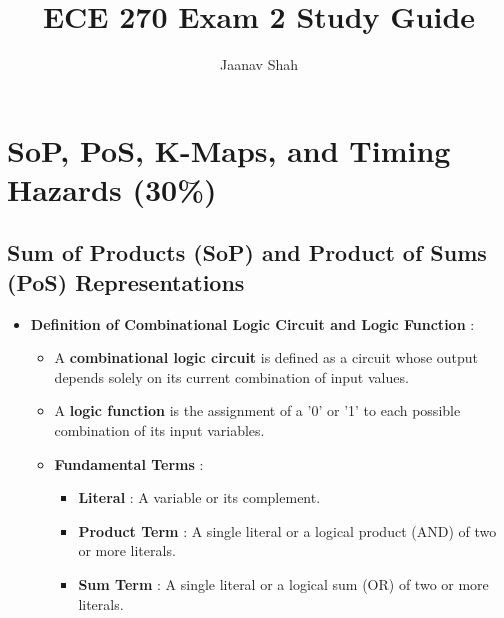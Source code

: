 \documentclass{article}
\author{Jaanav Shah}
\begin{document}
\title{ECE 270 Exam 2 Study Guide}
\maketitle

\section{SoP, PoS, K-Maps, and Timing Hazards (30\%)}
\subsection{Sum of Products (SoP) and Product of Sums (PoS) Representations}

\begin{itemize}
    \item \textbf{Definition of Combinational Logic Circuit and Logic Function} :
    
        \begin{itemize}
            \item A \textbf{combinational logic circuit} is defined as a circuit whose output depends solely on its current combination of input values.
            \item A \textbf{logic function} is the assignment of a '0' or '1' to each possible combination of its input variables.
        \end{itemize}
        
\begin{itemize}
\item \textbf{Fundamental Terms} :
    
        \begin{itemize}
            \item \textbf{Literal} : A variable or its complement.
            
            \item \textbf{Product Term} : A single literal or a logical product (AND) of two or more literals.
            
            \item \textbf{Sum Term} : A single literal or a logical sum (OR) of two or more literals.
            

\end{itemize}
\end{itemize}
\end{itemize}
\end{document}
